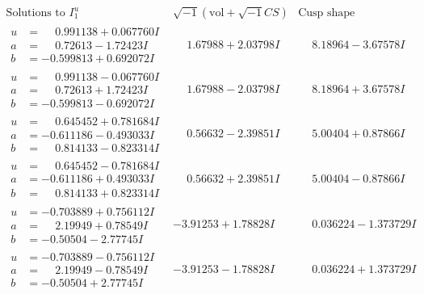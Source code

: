 \documentclass[1p]{elsarticle_modified}
\theoremstyle{definition}
\newcommand{\I}{\sqrt{-1}}
\begin{document}
$$\begin{array}{c|c|c}  
\text{Solutions to }I^u_{1}& \I (\text{vol} + \sqrt{-1}CS) & \text{Cusp shape}\\
 \hline 
\begin{aligned}
u &= \phantom{-}0.991138 + 0.067760 I \\
a &= \phantom{-}0.72613 - 1.72423 I \\
b &= -0.599813 + 0.692072 I\end{aligned}
 & \phantom{-}1.67988 + 2.03798 I & \phantom{-}8.18964 - 3.67578 I \\ \hline\begin{aligned}
u &= \phantom{-}0.991138 - 0.067760 I \\
a &= \phantom{-}0.72613 + 1.72423 I \\
b &= -0.599813 - 0.692072 I\end{aligned}
 & \phantom{-}1.67988 - 2.03798 I & \phantom{-}8.18964 + 3.67578 I \\ \hline\begin{aligned}
u &= \phantom{-}0.645452 + 0.781684 I \\
a &= -0.611186 - 0.493033 I \\
b &= \phantom{-}0.814133 - 0.823314 I\end{aligned}
 & \phantom{-}0.56632 - 2.39851 I & \phantom{-}5.00404 + 0.87866 I \\ \hline\begin{aligned}
u &= \phantom{-}0.645452 - 0.781684 I \\
a &= -0.611186 + 0.493033 I \\
b &= \phantom{-}0.814133 + 0.823314 I\end{aligned}
 & \phantom{-}0.56632 + 2.39851 I & \phantom{-}5.00404 - 0.87866 I \\ \hline\begin{aligned}
u &= -0.703889 + 0.756112 I \\
a &= \phantom{-}2.19949 + 0.78549 I \\
b &= -0.50504 - 2.77745 I\end{aligned}
 & -3.91253 + 1.78828 I & \phantom{-}0.036224 - 1.373729 I \\ \hline\begin{aligned}
u &= -0.703889 - 0.756112 I \\
a &= \phantom{-}2.19949 - 0.78549 I \\
b &= -0.50504 + 2.77745 I\end{aligned}
 & -3.91253 - 1.78828 I & \phantom{-}0.036224 + 1.373729 I \\ \hline\begin{aligned}

\end{aligned}
\end{array}$$
\end{document}
